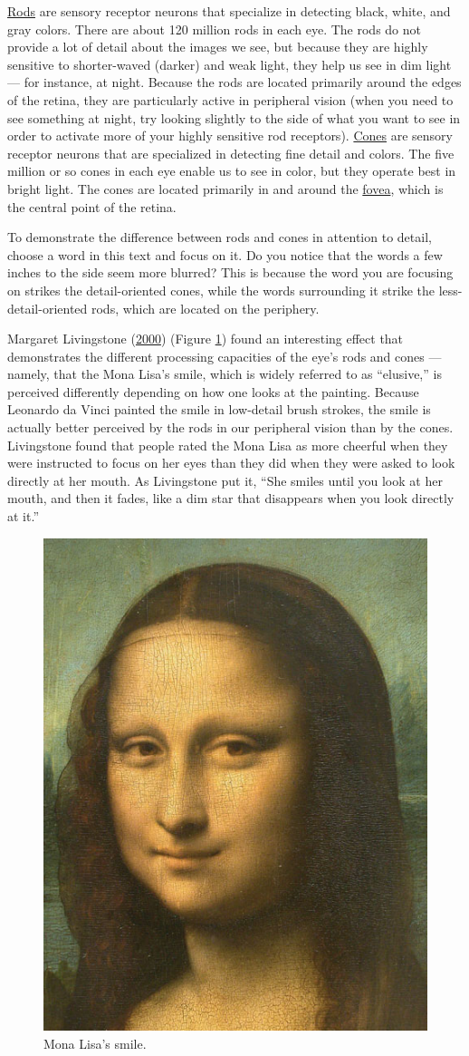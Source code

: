 \documentclass[
]{krantz}
\begin{document}
\protect\hyperlink{rods}{Rods} are sensory receptor neurons that specialize in detecting black, white, and gray colors. There are about 120 million rods in each eye. The rods do not provide a lot of detail about the images we see, but because they are highly sensitive to shorter-waved (darker) and weak light, they help us see in dim light --- for instance, at night. Because the rods are located primarily around the edges of the retina, they are particularly active in peripheral vision (when you need to see something at night, try looking slightly to the side of what you want to see in order to activate more of your highly sensitive rod receptors). \protect\hyperlink{cones}{Cones} are sensory receptor neurons that are specialized in detecting fine detail and colors. The five million or so cones in each eye enable us to see in color, but they operate best in bright light. The cones are located primarily in and around the \protect\hyperlink{fovea}{fovea}, which is the central point of the retina.

To demonstrate the difference between rods and cones in attention to detail, choose a word in this text and focus on it. Do you notice that the words a few inches to the side seem more blurred? This is because the word you are focusing on strikes the detail-oriented cones, while the words surrounding it strike the less-detail-oriented rods, which are located on the periphery.

Margaret Livingstone (\protect\hyperlink{ref-livingstone2000warm}{2000}) (Figure \ref{fig:monalisa}) found an interesting effect that demonstrates the different processing capacities of the eye's rods and cones --- namely, that the Mona Lisa's smile, which is widely referred to as ``elusive,'' is perceived differently depending on how one looks at the painting. Because Leonardo da Vinci painted the smile in low-detail brush strokes, the smile is actually better perceived by the rods in our peripheral vision than by the cones. Livingstone found that people rated the Mona Lisa as more cheerful when they were instructed to focus on her eyes than they did when they were asked to look directly at her mouth. As Livingstone put it, ``She smiles until you look at her mouth, and then it fades, like a dim star that disappears when you look directly at it.''

\begin{figure}

{\centering \includegraphics[width=0.3\linewidth]{images/ch2/fig2} 

}

\caption{Mona Lisa's smile.}\label{fig:monalisa}
\end{figure}
\end{document}
